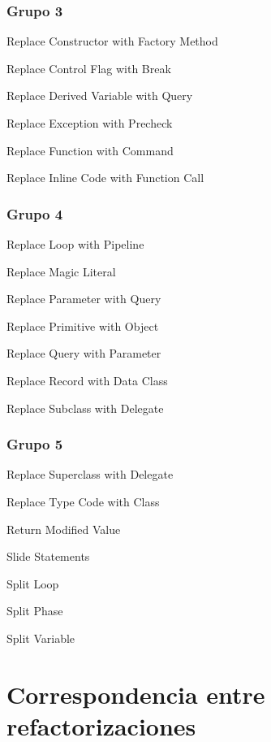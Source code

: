 \documentclass[11pt,a4paper,oneside]{book}
\begin{document}

\subsection{Grupo 3}
Replace Constructor with Factory Method

Replace Control Flag with Break

Replace Derived Variable with Query

Replace Exception with Precheck

Replace Function with Command

Replace Inline Code with Function Call

\subsection{Grupo 4}
Replace Loop with Pipeline

Replace Magic Literal

Replace Parameter with Query

Replace Primitive with Object

Replace Query with Parameter

Replace Record with Data Class

Replace Subclass with Delegate

\subsection{Grupo 5}
Replace Superclass with Delegate

Replace Type Code with Class

Return Modified Value

Slide Statements

Split Loop

Split Phase

Split Variable



\chapter*{Correspondencia entre refactorizaciones}
\end{document}
